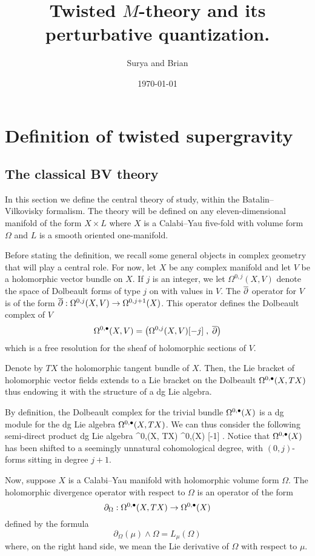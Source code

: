 \documentclass[11pt]{amsart}
\author{Surya and Brian}
\date{\today}
\title{Twisted \(M\)-theory and its perturbative quantization.}
\begin{document}
\maketitle
\tableofcontents


\section{Definition of twisted supergravity}

\label{sec:org24653eb}
\subsection{The classical BV theory}
\label{sec:org5c9d94b}
In this section we define the central theory of study, within the Batalin--Vilkovisky formalism.
The theory will be defined on any eleven-dimensional manifold of the form $X \times L$ where $X$ is a Calabi--Yau five-fold with volume form $\Omega$ and $L$ is a smooth oriented one-manifold.

Before stating the definition, we recall some general objects in complex geometry that will play a central role.
For now, let $X$ be any complex manifold and let $V$ be a holomorphic vector bundle on $X$.
If $j$ is an integer, we let $\Omega^{0,j}(X, V)$ denote the space of Dolbeault forms of type $j$ on with values in $V$.
The $\overline{\partial}$ operator for $V$ is of the form $\overline{\partial} : \Omega^{0,j}(X, V)\to \Omega^{0,j+1}(X)$.
This operator defines the Dolbeault complex of $V$
\[
  \Omega^{0,\bullet}(X, V) = \left(\Omega^{0,j}(X, V)[-j] \; , \; \overline{\partial}\right)
\]
which is a free resolution for the sheaf of holomorphic sections of $V$.

Denote by $TX$ the holomorphic tangent bundle of $X$.
Then, the Lie bracket of holomorphic vector fields extends to a Lie bracket on the Dolbeault $\Omega^{0,\bullet}(X, TX)$ thus endowing it with the structure of a dg Lie algebra.

By definition, the Dolbeault complex for the trivial bundle $\Omega^{0,\bullet}(X)$ is a dg module for the dg Lie algebra $\Omega^{0,\bullet}(X, TX)$.
We can thus consider the following semi-direct product dg Lie algebra
\beqn\label{eqn:div1}
  \Omega^{0,\bu}(X, TX) \oplus \Omega^{0,\bu}(X) [-1] .
\eeqn
Notice that $\Omega^{0,\bullet}(X)$ has been shifted to a seemingly unnatural cohomological degree, with $(0,j)$-forms sitting in degree $j+1$.

Now, suppose $X$ is a Calabi--Yau manifold with holomorphic volume form $\Omega$.
The holomorphic divergence operator with respect to $\Omega$ is an operator of the form
\[
  \partial_\Omega : \Omega^{0,\bullet}(X, TX) \to \Omega^{0,\bullet}(X)
\]
defined by the formula
\[
  \partial_\Omega (\mu) \wedge \Omega = L_\mu (\Omega)
\]
where, on the right hand side, we mean the Lie derivative of $\Omega$ with respect to $\mu$.
\end{document}
